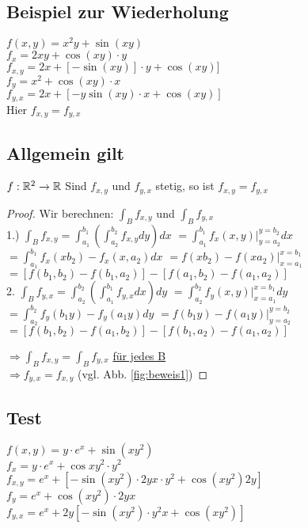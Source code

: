 \renewcommand{\ldate}{2015-10-15}

\subsection{Beispiel zur Wiederholung}
$f(x,y) = x^2y+\sin(xy)$\\
$f_x = 2xy+\cos(xy) \cdot y$\\
$f_{x,y}= 2x+[-\sin(xy)]\cdot y + \cos(xy)]$\\
$f_y = x^2 + \cos(xy) \cdot x$\\
$f_{y,x} = 2x+[-y \sin(xy) \cdot x + \cos(xy)]$\\
Hier $ f_{x,y} = f_{y,x} $

\subsection{Allgemein gilt}
$f:\mathbb{R}^2 \rightarrow \mathbb{R}$
Sind $f_{x,y} $ und $f_{y,x}$ stetig, so ist $f_{x,y}=f_{y,x}$\\

\begin{proof}

Wir berechnen: $\int_B f_{x,y} $ und $\int_B f_{y,x} $ \\

1.) $\int_B f_{x,y} = \int_{a_1}^{b_1} ( \int_{a_2}^{b_2} f_{x,y} dy) dx $
$= \int_{a_1}^{b_1} f_x(x,y) |_{y=a_2}^{y=b_2} dx $
$= \int_{a_1}^{b_1} f_x(x b_2) - f_x(x, a_2) dx $
$= f(x b_2) - f(x a_2) |_{x=a_1}^{x=b_1} $\\
$= [f(b_1, b_2) - f(b_1, a_2)] - [f(a_1, b_2)-f(a_1,a_2)]$\\

2. $\int_B f_{y,x} = \int_{a_2}^{b_2} ( \int_{a_1}^{b_1} f_{y,x} dx) dy $
$= \int_{a_2}^{b_2} f_y(x,y) |_{x=a_1}^{x=b_1} dy $
$= \int_{a_2}^{b_2} f_y(b_1 y) - f_y(a_1 y) dy $
$= f(b_1 y) - f(a_1 y) |_{y=a_2}^{y=b_2} $
$= [f(b_1, b_2) - f(a_1, b_2)] - [f(b_1, a_2)-f(a_1,a_2)]$

$\Rightarrow \int_B f_{x,y} = \int_B f_{y,x}$ \underline{für jedes B}\\
$ \Rightarrow f_{y,x} = f_{x,y} $ (vgl. Abb. \ref{fig:beweis1})
\end{proof}

\subsection{Test}
$ f(x,y) = y\cdot e^x + \sin(xy^2) $\\
$ f_x= y\cdot e^x + \cos{xy^2} \cdot y^2$\\
$ f_{x,y} = e^x + [-\sin(xy^2)\cdot 2yx\cdot y^2 + \cos(xy^2)2y]$\\
$ f_y = e^x + \cos(xy^2) \cdot 2yx$\\
$ f_{y,x} = e^x + 2y[-\sin(xy^2) \cdot y^2 x + \cos(xy^2)] $\\


